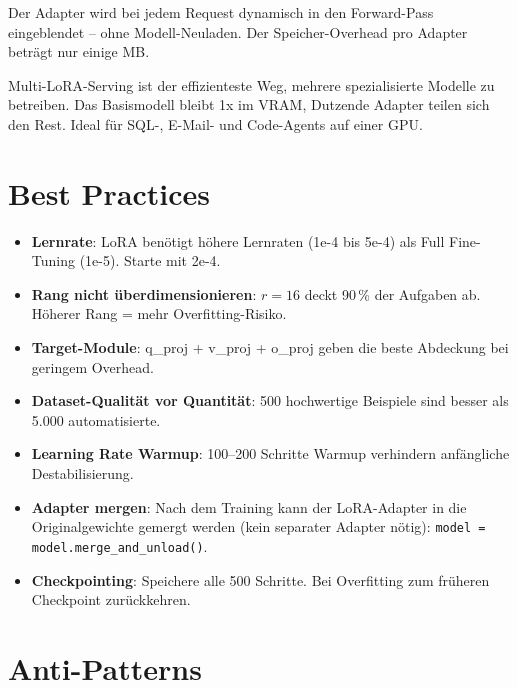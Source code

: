 Der Adapter wird bei jedem Request dynamisch in den Forward-Pass eingeblendet -- ohne Modell-Neuladen. Der Speicher-Overhead pro Adapter beträgt nur einige MB.

\begin{praxishinweis}
Multi-LoRA-Serving ist der effizienteste Weg, mehrere spezialisierte Modelle zu betreiben. Das Basismodell bleibt 1x im VRAM, Dutzende Adapter teilen sich den Rest. Ideal für SQL-, E-Mail- und Code-Agents auf einer GPU.
\end{praxishinweis}

\section{Best Practices}

\begin{itemize}[leftmargin=*]
    \item \textbf{Lernrate}: LoRA benötigt höhere Lernraten (1e-4 bis 5e-4) als Full Fine-Tuning (1e-5). Starte mit 2e-4.
    \item \textbf{Rang nicht überdimensionieren}: $r=16$ deckt 90\,\% der Aufgaben ab. Höherer Rang = mehr Overfitting-Risiko.
    \item \textbf{Target-Module}: q\_proj + v\_proj + o\_proj geben die beste Abdeckung bei geringem Overhead.
    \item \textbf{Dataset-Qualität vor Quantität}: 500 hochwertige Beispiele sind besser als 5.000 automatisierte.
    \item \textbf{Learning Rate Warmup}: 100--200 Schritte Warmup verhindern anfängliche Destabilisierung.
    \item \textbf{Adapter mergen}: Nach dem Training kann der LoRA-Adapter in die Originalgewichte gemergt werden (kein separater Adapter nötig): \texttt{model = model.merge\_and\_unload()}.
    \item \textbf{Checkpointing}: Speichere alle 500 Schritte. Bei Overfitting zum früheren Checkpoint zurückkehren.
\end{itemize}

\section{Anti-Patterns}


